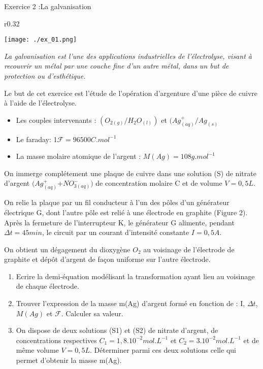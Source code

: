 \documentclass[12pt, french]{article}
\begin{document}
\begin{Box2}{Exercice 2 :La galvanisation }
	\begin{wrapfigure}[6]{r}{0.32\textwidth}
  \begin{center}
	  \vspace{-0.6cm}
	\texttt{[image: ./ex\_01.png]}
  \end{center}
\end{wrapfigure}
	\emph{La galvanisation est l’une des applications industrielles de l’électrolyse, visant à
recouvrir un métal par une couche fine d’un autre métal, dans un but de protection
ou d’esthétique.}

Le but de cet exercice est l’étude de l’opération d’argenture d’une pièce de cuivre à
l’aide de l’électrolyse.

\begin{itemize}
	\item Les couples intervenants : $(O_{2(g)}/H_2O_{(l)})$ et $(Ag^+_{(aq)}/Ag_{(s)}$
		
	\item Le faraday:  1$\mathscr{F}=96500 C.mol^{-1}$
	\item La masse molaire atomique de l’argent : $M(Ag) = 108 g.mol^{-1}$
\end{itemize}

On immerge complétement une plaque de cuivre dans une solution (S) de nitrate d'argent $(Ag^+_{(aq)}$+$NO^-_{3(aq)})$ de  concentration molaire C et de volume $V = 0,5 L$.

On relie la plaque par un fil conducteur à
l’un des pôles d’un générateur électrique G,
dont l’autre pôle est relié à une électrode en
graphite (Figure 2). Après la fermeture de
l’interrupteur K, le générateur G alimente,
pendant $\Delta{t} = 45 min$, le circuit par un courant
d’intensité constante $I = 0,5 A$.

On obtient un dégagement du dioxygène $O_2$
au voisinage de l’électrode de graphite et
dépôt d’argent de façon uniforme sur l’autre
électrode.

\begin{enumerate}
	\item Ecrire la demi-équation modélisant la transformation ayant lieu au voisinage de
chaque électrode.
\item Trouver l’expression de la masse m(Ag) d’argent formé en fonction de : I, $\Delta{t}$,
	$M(Ag)$ et $\mathscr{F}$. Calculer sa valeur.
\item  On dispose de deux solutions (S1) et (S2) de nitrate d’argent, de concentrations respectives $C_1 = 1,8.10^{-2} mol.L^{-1}$ et $C_2 = 3.10^{-2} mol.L^{-1}$ et de même volume
$V = 0,5 L$.
Déterminer parmi ces deux solutions celle qui permet d’obtenir la masse m(Ag).
\end{enumerate}

\end{Box2}
\end{document}
